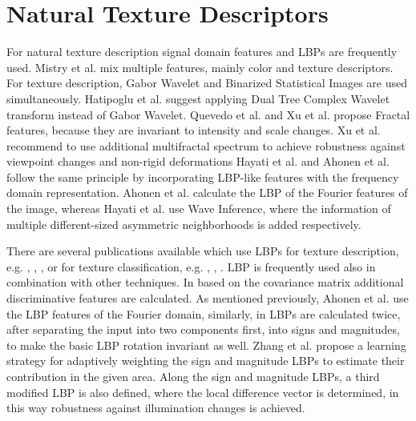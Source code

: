\documentclass[draft,final]{vutinfth} %
\begin{document}
\section*{Natural Texture Descriptors}
\par
For natural texture description signal domain features and LBPs are frequently used.
Mistry et al. \cite{mistry2017content}  mix multiple features, mainly color and texture descriptors.
For texture description, Gabor Wavelet and Binarized Statistical Images  \cite{kannala2012bsif} are used simultaneously.
Hatipoglu et al. \cite{hatipoglu2000image} suggest applying Dual Tree Complex Wavelet transform instead of Gabor Wavelet.
Quevedo et al. \cite{quevedo2002description} and Xu et al. \cite{xu2009viewpoint} propose Fractal features, because they are invariant to intensity and scale changes.
Xu et al. \cite{xu2009viewpoint} recommend to use additional multifractal spectrum to achieve robustness against viewpoint changes and non-rigid deformations  
Hayati et al. \cite{hayati2018wirif} and Ahonen et al. \cite{ahonen2009rotation} follow the same principle by incorporating LBP-like features with the frequency domain representation.
Ahonen et al. \cite{ahonen2009rotation} calculate the LBP of the Fourier features of the image, whereas Hayati et al. \cite{hayati2018wirif} use Wave Inference, where the information of multiple different-sized asymmetric neighborhoods is added respectively. 
\par
There are several publications available which use LBPs for texture description, e.g. \cite{guo2012discriminative}, \cite{hong2014combining}, \cite{ahonen2009rotation}, or for texture classification, e.g. \cite{khellah2011texture}, \cite{guo2010rotation}, \cite{zhang2017learning}.
LBP is frequently used also in combination with other techniques. 
In \cite{hong2014combining} based on the covariance matrix additional discriminative features are calculated. 
As mentioned previously, Ahonen et al. \cite{ahonen2009rotation} use the LBP features of the Fourier domain, similarly, in \cite{guo2010completed} LBPs are calculated twice, after separating the input into two components first, into signs and magnitudes, to make the basic LBP rotation invariant as well.
Zhang et al.  \cite{zhang2017learning} propose a learning strategy for adaptively weighting the sign and magnitude LBPs to estimate their contribution in the given area. 
Along the sign and magnitude LBPs, a third modified LBP is also defined, where the local difference vector is determined, in this way robustness against illumination changes is achieved.
\end{document}
